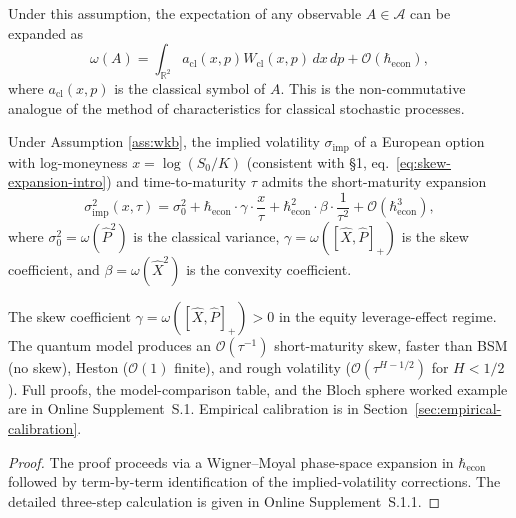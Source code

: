 Under this assumption, the expectation of any observable $A \in \mathcal{A}$ can
be expanded as
\begin{equation*}
    \omega(A) = \int_{\mathbb{R}^2} a_{\mathrm{cl}}(x, p) W_{\mathrm{cl}}(x, p)
    \, dx \, dp + \mathcal{O}(\hbar_{\mathrm{econ}}),
\end{equation*}
where $a_{\mathrm{cl}}(x, p)$ is the classical symbol of $A$. This is the
non-commutative analogue of the method of characteristics for classical stochastic
processes.

\begin{theorem}\label{thm:effective-vol}
Under Assumption \ref{ass:wkb}, the implied volatility $\sigma_{\mathrm{imp}}$ of
a European option with log-moneyness $x = \log(S_0/K)$ (consistent with §1,
eq.~\eqref{eq:skew-expansion-intro}) and time-to-maturity $\tau$ admits the
short-maturity expansion
\begin{equation}\label{eq:effective-vol}
    \sigma_{\mathrm{imp}}^2(x, \tau) = \sigma_0^2
    + \hbar_{\mathrm{econ}} \cdot \gamma \cdot \frac{x}{\tau}
    + \hbar_{\mathrm{econ}}^2 \cdot \beta \cdot \frac{1}{\tau^2}
    + \mathcal{O}(\hbar_{\mathrm{econ}}^3),
\end{equation}
where $\sigma_0^2 = \omega(\hat{P}^2)$ is the classical variance,
$\gamma = \omega([\hat{X}, \hat{P}]_+)$ is the skew coefficient, and
$\beta = \omega(\hat{X}^2)$ is the convexity coefficient.
\end{theorem}

\begin{remark}
\label{rem:skew-sign}
The skew coefficient $\gamma = \omega([\hat{X}, \hat{P}]_+) > 0$ in the equity
leverage-effect regime. The quantum model produces an $\mathcal{O}(\tau^{-1})$
short-maturity skew, faster than BSM (no skew), Heston ($\mathcal{O}(1)$ finite),
and rough volatility ($\mathcal{O}(\tau^{H-1/2})$ for $H < 1/2$). Full proofs,
the model-comparison table, and the Bloch sphere worked example are in Online
Supplement~S.1. Empirical calibration is in Section~\ref{sec:empirical-calibration}.
\end{remark}

\begin{proof}
The proof proceeds via a Wigner--Moyal phase-space expansion in $\hbar_{\mathrm{econ}}$
followed by term-by-term identification of the implied-volatility corrections. The
detailed three-step calculation is given in Online Supplement~S.1.1.
\end{proof}

